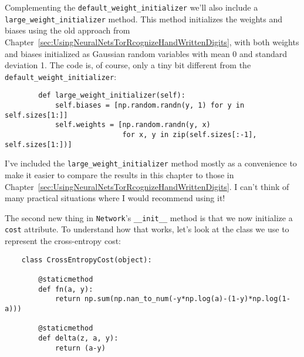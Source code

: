 Complementing the \lstinline{default_weight_initializer} we'll also include a \lstinline{large_weight_initializer} method. This method initializes the weights and biases using the old approach from Chapter~\ref{sec:UsingNeuralNetsTorRcognizeHandWrittenDigits}, with both weights and biases initialized as Gaussian random variables with mean 0 and standard deviation 1. The code is, of course, only a tiny bit different from the \lstinline{default_weight_initializer}:
\begin{lstlisting}
        def large_weight_initializer(self):
            self.biases = [np.random.randn(y, 1) for y in self.sizes[1:]]
            self.weights = [np.random.randn(y, x) 
                            for x, y in zip(self.sizes[:-1], self.sizes[1:])]
\end{lstlisting}
I've included the \lstinline{large_weight_initializer} method mostly as a convenience to make it easier to compare the results in this chapter to those in Chapter~\ref{sec:UsingNeuralNetsTorRcognizeHandWrittenDigits}. I can't think of many practical situations where I would recommend using it!

The second new thing in \lstinline{Network}'s \lstinline{__init__} method is that we now initialize a \lstinline{cost} attribute. To understand how that works, let's look at the class we use to represent the cross-entropy cost:


\begin{lstlisting}
    class CrossEntropyCost(object):
    
        @staticmethod
        def fn(a, y):
            return np.sum(np.nan_to_num(-y*np.log(a)-(1-y)*np.log(1-a)))
    
        @staticmethod
        def delta(z, a, y):
            return (a-y)
    
\end{lstlisting}


